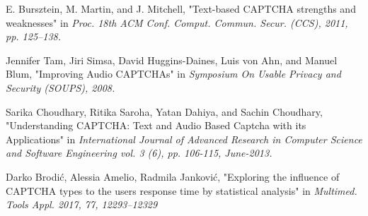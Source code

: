 \begin{thebibliography}{9}
 E. Bursztein, M. Martin, and J. Mitchell, "Text-based CAPTCHA strengths and weaknesses" in \emph{Proc. 18th ACM Conf. Comput. Commun. Secur. (CCS), 2011, pp. 125–138.}

 Jennifer Tam, Jiri Simsa, David Huggins-Daines, Luis von Ahn, and Manuel Blum, "Improving Audio CAPTCHAs" in \emph{Symposium On Usable Privacy and Security (SOUPS), 2008.}

 Sarika Choudhary, Ritika Saroha, Yatan Dahiya, and Sachin Choudhary, "Understanding CAPTCHA: Text and Audio Based Captcha with its Applications" in \emph{International Journal of Advanced Research in Computer Science and Software Engineering vol. 3 (6), pp. 106-115, June-2013.}

 Darko Brodi\'c, Alessia Amelio, Radmila Jankovi\'c, "Exploring the influence of CAPTCHA types to the users response time by statistical analysis" in \emph{Multimed. Tools Appl. 2017, 77, 12293–12329}

\end{thebibliography}